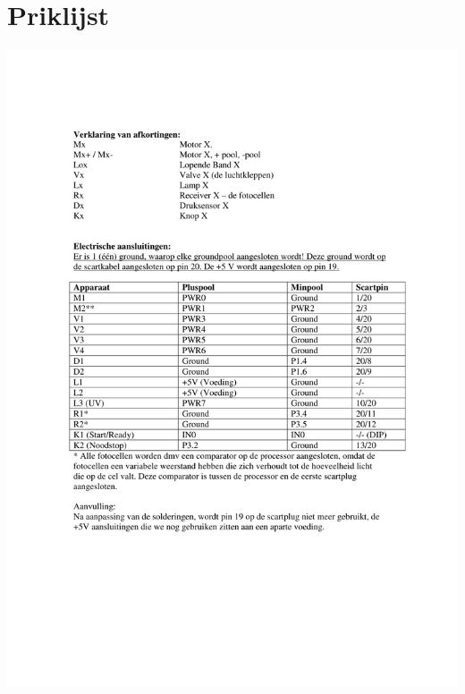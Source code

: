 \section{Priklijst}

    \vspace{-6em}

    \begin{center}
    \includegraphics[scale=.7]{priklijst1}
    \vspace{-6em}

\end{center}
